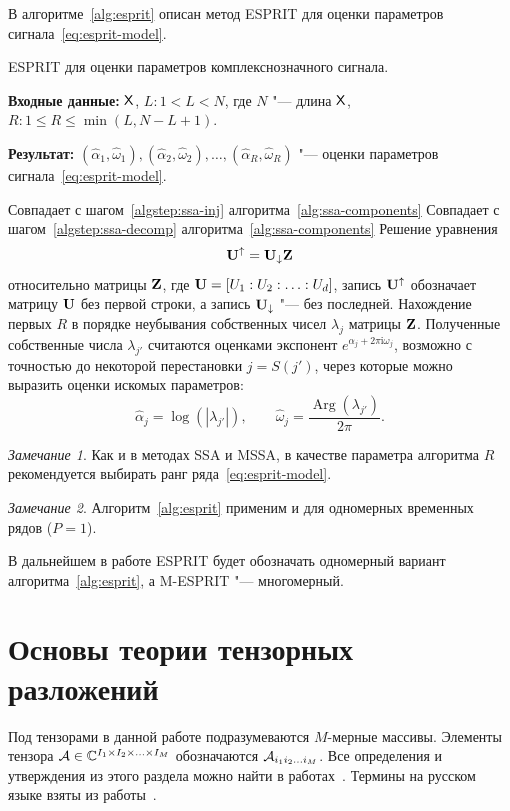 \documentclass[specialist,
  substylefile=spbu_report.rtx,
subf,href,colorlinks=true, 12pt]{disser}
\theoremstyle{plain}
\theoremstyle{definition}
\theoremstyle{remark}
\newtheorem{remark}{Замечание}[section]
\newcommand{\Input}{\textbf{Входные данные: }}
\newcommand{\Output}{\textbf{Результат: }}
\newcommand{\iu}{\mathrm{i}}
\begin{document}
В алгоритме~\ref{alg:esprit} описан метод ESPRIT для оценки параметров
сигнала~\eqref{eq:esprit-model}.
\begin{algorithm}[!ht]
  \caption{ESPRIT для оценки параметров комплекснозначного сигнала.}
  \label{alg:esprit}
  \Input $\mathsf{X}$, $L: 1 < L < N$, где $N$ "--- длина $\mathsf{X}$, $R: 1
  \leqslant R\leqslant \min(L, N-L+1)$.

  \Output $\left(\widehat{\alpha}_1, \widehat{\omega}_1\right),
  \left(\widehat{\alpha}_2, \widehat{\omega}_2\right), \ldots,
  \left(\widehat{\alpha}_R, \widehat{\omega}_R\right)$ "--- оценки параметров
  сигнала~\eqref{eq:esprit-model}.
  \begin{algorithmic}[1]
    \State Совпадает с шагом~\ref{algstep:ssa-inj}
    алгоритма~\ref{alg:ssa-components}
    \State Совпадает с шагом~\ref{algstep:ssa-decomp}
    алгоритма~\ref{alg:ssa-components}
    \State Решение уравнения
    \[
      \mathbf{U}^{\uparrow}=\mathbf{U}_{\downarrow}\mathbf{Z}
    \]
    относительно матрицы $\mathbf{Z}$, где $\mathbf{U} = [U_1:U_2:\ldots: U_d]$,
    запись $\mathbf{U}^{\uparrow}$ обозначает матрицу $\mathbf{U}$ без первой строки, а
    запись $\mathbf{U}_{\downarrow}$ "--- без последней.
    \State Нахождение первых $R$ в порядке неубывания собственных
    чисел $\lambda_j$ матрицы $\mathbf{Z}$.
    Полученные собственные числа $\lambda_{j'}$ считаются оценками
    экспонент $e^{\alpha_j + 2\pi\iu \omega_j}$, возможно с точностью
    до некоторой перестановки
    $j = S (j')$, через которые можно выразить
    оценки искомых параметров:
    \[
      \widehat{\alpha}_j = \log\left(\left|\lambda_{j'}\right|\right), \qquad
      \widehat{\omega}_j =
      \frac{\operatorname{Arg}\left(\lambda_{j'}\right)}{2 \pi}.
    \]
  \end{algorithmic}
\end{algorithm}
\begin{remark}
  Как и в методах SSA и MSSA, в качестве параметра алгоритма $R$
  рекомендуется выбирать ранг
  ряда~\eqref{eq:esprit-model}.
\end{remark}
\begin{remark}
  Алгоритм~\ref{alg:esprit} применим и для одномерных временных рядов ($P=1$).
\end{remark}

В дальнейшем в работе ESPRIT будет обозначать одномерный вариант
алгоритма~\ref{alg:esprit}, а M-ESPRIT "--- многомерный.

\section{Основы теории тензорных разложений}\label{sec:tensor-decompositions}
Под тензорами в данной работе подразумеваются $M$-мерные массивы.
Элементы тензора $\mathcal{A} \in \mathbb{C}^{I_1 \times I_2 \times \ldots \times
I_M}$ обозначаются
$\mathcal{A}_{i_1 i_2 \ldots i_M}$.
Все определения и утверждения из этого раздела можно найти в
работах~\cite{hosvd, tensor-bg, tensor-bg2, tensor-bg3}.
Термины на русском языке взяты из работы~\cite{tensor-rus}.
\end{document}
